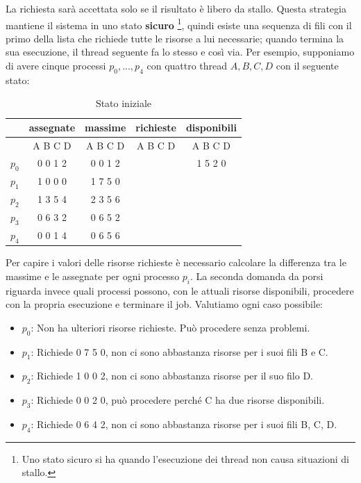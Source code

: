 \noindent La richiesta sarà accettata solo se il risultato è libero da stallo. Questa strategia mantiene il sistema in uno stato \textbf{sicuro}
\footnote{Uno stato sicuro si ha quando l'esecuzione dei thread non causa situazioni di stallo.}, quindi esiste una sequenza di fili con il primo della
lista che richiede tutte le risorse a lui necessarie; quando termina la sua esecuzione, il thread seguente fa lo stesso e così via. Per esempio,
supponiamo di avere cinque processi $p_0, ..., p_4$ con quattro thread $A, B, C, D$ con il seguente stato: \begin{table}[h]
    \centering
    \begin{tabular}{|c|c|c|c|c|}
        \hline
        & assegnate & massime & richieste & disponibili\\
        \hline
        & A B C D & A B C D & A B C D & A B C D\\
        \hline
        $p_0$ & 0 0 1 2 & 0 0 1 2 & & 1 5 2 0\\
        \hline
        $p_1$ & 1 0 0 0 & 1 7 5 0 & & \\
        \hline
        $p_2$ & 1 3 5 4 & 2 3 5 6 & & \\
        \hline
        $p_3$ & 0 6 3 2 & 0 6 5 2 & & \\
        \hline
        $p_4$ & 0 0 1 4 & 0 6 5 6 & & \\
        \hline
    \end{tabular}
    \caption{Stato iniziale}
\end{table}

\noindent Per capire i valori delle risorse richieste è necessario calcolare la differenza tra le massime e le assegnate per ogni processo $p_i$. La
seconda domanda da porsi riguarda invece quali processi possono, con le attuali risorse disponibili, procedere con la propria esecuzione e terminare il
job. Valutiamo ogni caso possibile: \begin{itemize}
    \item $p_0$: Non ha ulteriori risorse richieste. Può procedere senza problemi.
    \item $p_1$: Richiede 0 7 5 0, non ci sono abbastanza risorse per i suoi fili B e C.
    \item $p_2$: Richiede 1 0 0 2, non ci sono abbastanza risorse per il suo filo D.
    \item $p_3$: Richiede 0 0 2 0, può procedere perché C ha due risorse disponibili.
    \item $p_4$: Richiede 0 6 4 2, non ci sono abbastanza risorse per i suoi fili B, C, D.
\end{itemize}


